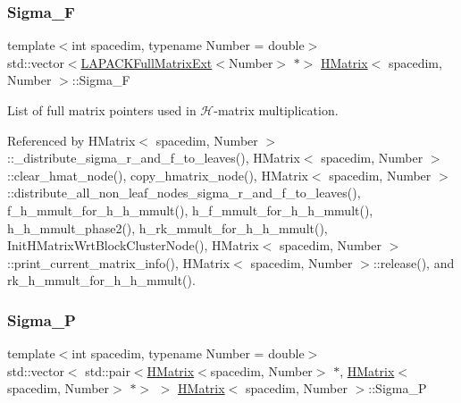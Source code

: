 \mbox{\label{classHMatrix_aa659b6df63d533432ec1a24435cd9c40}} 
\subsubsection{\texorpdfstring{Sigma\+\_\+F}{Sigma\_F}}
{\footnotesize\ttfamily template$<$int spacedim, typename Number = double$>$ \\
std\+::vector$<$\hyperlink{classLAPACKFullMatrixExt}{L\+A\+P\+A\+C\+K\+Full\+Matrix\+Ext}$<$Number$>$ $\ast$$>$ \hyperlink{classHMatrix}{H\+Matrix}$<$ spacedim, Number $>$\+::Sigma\+\_\+F\hspace{0.3cm}{\ttfamily [private]}}

List of full matrix pointers used in $\mathcal{H}$-\/matrix multiplication. 

Referenced by H\+Matrix$<$ spacedim, Number $>$\+::\+\_\+distribute\+\_\+sigma\+\_\+r\+\_\+and\+\_\+f\+\_\+to\+\_\+leaves(), H\+Matrix$<$ spacedim, Number $>$\+::clear\+\_\+hmat\+\_\+node(), copy\+\_\+hmatrix\+\_\+node(), H\+Matrix$<$ spacedim, Number $>$\+::distribute\+\_\+all\+\_\+non\+\_\+leaf\+\_\+nodes\+\_\+sigma\+\_\+r\+\_\+and\+\_\+f\+\_\+to\+\_\+leaves(), f\+\_\+h\+\_\+mmult\+\_\+for\+\_\+h\+\_\+h\+\_\+mmult(), h\+\_\+f\+\_\+mmult\+\_\+for\+\_\+h\+\_\+h\+\_\+mmult(), h\+\_\+h\+\_\+mmult\+\_\+phase2(), h\+\_\+rk\+\_\+mmult\+\_\+for\+\_\+h\+\_\+h\+\_\+mmult(), Init\+H\+Matrix\+Wrt\+Block\+Cluster\+Node(), H\+Matrix$<$ spacedim, Number $>$\+::print\+\_\+current\+\_\+matrix\+\_\+info(), H\+Matrix$<$ spacedim, Number $>$\+::release(), and rk\+\_\+h\+\_\+mmult\+\_\+for\+\_\+h\+\_\+h\+\_\+mmult().

\mbox{\label{classHMatrix_a3d96d0252ef8c873ae06cf87874acaf3}} 
\subsubsection{\texorpdfstring{Sigma\+\_\+P}{Sigma\_P}}
{\footnotesize\ttfamily template$<$int spacedim, typename Number = double$>$ \\
std\+::vector$<$ std\+::pair$<$\hyperlink{classHMatrix}{H\+Matrix}$<$spacedim, Number$>$ $\ast$, \hyperlink{classHMatrix}{H\+Matrix}$<$spacedim, Number$>$ $\ast$$>$ $>$ \hyperlink{classHMatrix}{H\+Matrix}$<$ spacedim, Number $>$\+::Sigma\+\_\+P\hspace{0.3cm}{\ttfamily [private]}}

